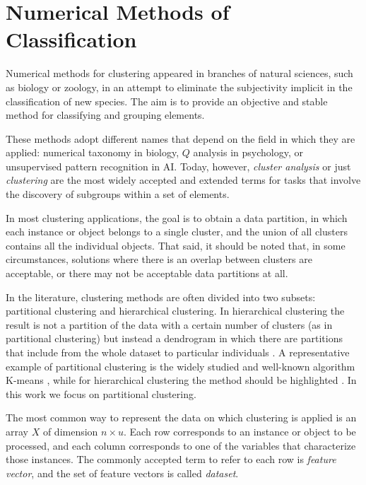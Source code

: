 \section{Numerical Methods of Classification} \label{sec:NumMethClassif}

Numerical methods for clustering appeared in branches of natural sciences, such as biology or zoology, in an attempt to eliminate the subjectivity implicit in the classification of new species. The aim is to provide an objective and stable method for classifying and grouping elements.

These methods adopt different names that depend on the field in which they are applied: numerical taxonomy in biology, $Q$ analysis in psychology, or unsupervised pattern recognition in \acf{AI}. Today, however, \textit{cluster analysis} or just \textit{clustering} are the most widely accepted and extended terms for tasks that involve the discovery of subgroups within a set of elements.

In most clustering applications, the goal is to obtain a data partition, in which each instance or object belongs to a single cluster, and the union of all clusters contains all the individual objects. That said, it should be noted that, in some circumstances, solutions where there is an overlap between clusters are acceptable, or there may not be acceptable data partitions at all.

In the literature, clustering methods are often divided into two subsets: partitional clustering and hierarchical clustering. In hierarchical clustering the result is not a partition of the data with a certain number of clusters (as in partitional clustering) but instead a dendrogram in which there are partitions that include from the whole dataset to particular individuals \cite{Everitt:2009:CA:1538772}. A representative example of partitional clustering is the widely studied and well-known algorithm K-means \cite{wu2009top}, while for hierarchical clustering the  method should be highlighted \cite{guha1998cure}. In this work we focus on partitional clustering.

The most common way to represent the data on which clustering is applied is an array $X$ of dimension $n\times u$. Each row corresponds to an instance or object to be processed, and each column corresponds to one of the variables that characterize those instances. The commonly accepted term to refer to each row is \textit{feature vector}, and the set of feature vectors is called \textit{dataset}.


